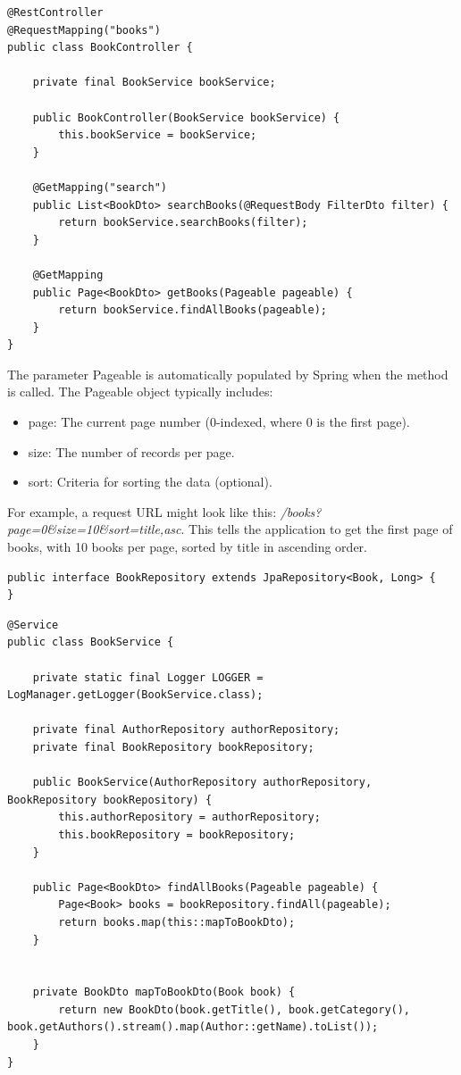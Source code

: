 \begin{lstlisting}
@RestController
@RequestMapping("books")
public class BookController {

    private final BookService bookService;

    public BookController(BookService bookService) {
        this.bookService = bookService;
    }

    @GetMapping("search")
    public List<BookDto> searchBooks(@RequestBody FilterDto filter) {
        return bookService.searchBooks(filter);
    }

    @GetMapping
    public Page<BookDto> getBooks(Pageable pageable) {
        return bookService.findAllBooks(pageable);
    }
}
\end{lstlisting}

The parameter Pageable is automatically populated by Spring when the method is called. The Pageable object typically includes:
\begin{itemize}
\item page: The current page number (0-indexed, where 0 is the first page).
\item size: The number of records per page.
\item sort: Criteria for sorting the data (optional).
\end{itemize}

For example, a request URL might look like this: \textit{/books?page=0\&size=10\&sort=title,asc}. This tells the application to get the first page of books, with 10 books per page, sorted by title in ascending order.

\begin{lstlisting}
public interface BookRepository extends JpaRepository<Book, Long> {
}
\end{lstlisting}

\begin{lstlisting}
@Service
public class BookService {

    private static final Logger LOGGER = LogManager.getLogger(BookService.class);

    private final AuthorRepository authorRepository;
    private final BookRepository bookRepository;

    public BookService(AuthorRepository authorRepository, BookRepository bookRepository) {
        this.authorRepository = authorRepository;
        this.bookRepository = bookRepository;
    }

    public Page<BookDto> findAllBooks(Pageable pageable) {
        Page<Book> books = bookRepository.findAll(pageable);
        return books.map(this::mapToBookDto);
    }


    private BookDto mapToBookDto(Book book) {
        return new BookDto(book.getTitle(), book.getCategory(), book.getAuthors().stream().map(Author::getName).toList());
    }
}
\end{lstlisting}

